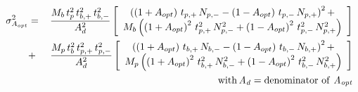 


\begin{eqnarray*}
  \sigma_{A_{opt}}^2 & = & \,
         {\frac{M_b\,t_p^2\,t_{b,+}^2\,t_{b,-}^2} {A_d^2}}
         \left[ \begin{array}{c}
		\left( \left(1+A_{opt}\right)\,t_{p,+}\,N_{p,-} -
		         \left(1-A_{opt}\right)\,t_{p,-}\,N_{p,+} \right)^2 + \\
		M_b\left( 
			\left(1+A_{opt}\right)^2\,t_{p,+}^2\,N_{p,-}^2
		     +\left(1-A_{opt}\right)^2\,t_{p,-}^2\,N_{p,+}^2
		\right) \\
         \end{array}\right] \\
         & + & 
         {\frac{M_p\,t_b^2\,t_{p,+}^2\,t_{p,-}^2} {A_d^2}}
         \left[ \begin{array}{c}
		\left( \left(1+A_{opt}\right)\,t_{b,+}\,N_{b,-} -
		         \left(1-A_{opt}\right)\,t_{b,-}\,N_{b,+} \right)^2 + \\
		M_p\left( 
			\left(1+A_{opt}\right)^2\,t_{b,+}^2\,N_{b,-}^2
		     +\left(1-A_{opt}\right)^2\,t_{b,-}^2\,N_{b,+}^2
		\right) \\
         \end{array}\right] \\
         & \, & \mathrm{with \, {\it A_{d}} = 
            denominator \ of \ {\it A_{opt}}}
\end{eqnarray*}

